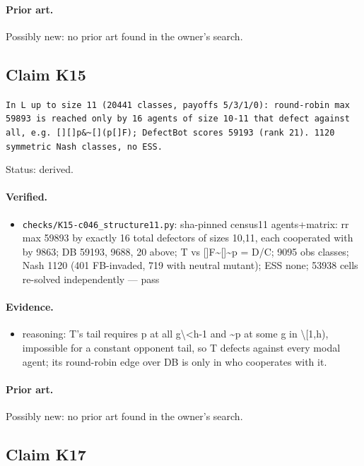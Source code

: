 \documentclass{article}
\begin{document}
\paragraph{Prior art.} Possibly new: no prior art found in the owner's search.

\subsection*{Claim K15}

\texttt{In L up to size 11 (20441 classes, payoffs 5/3/1/0): round-robin max 59893 is reached only by 16 agents of size 10-11 that defect against all, e.g. [][]p\&\textasciitilde{}[](p\textbar{}[]F); DefectBot scores 59193 (rank 21). 1120 symmetric Nash classes, no ESS.}

Status: derived.

\paragraph{Verified.}
\begin{itemize}
\item \texttt{checks/K15-c046\_structure11.py}: sha-pinned census11 agents+matrix: rr max 59893 by exactly 16 total defectors of sizes 10,11, each cooperated with by 9863; DB 59193, 9688, 20 above; T vs []F\textbar{}\textasciitilde{}[]\textasciitilde{}p = D/C; 9095 obs classes; Nash 1120 (401 FB-invaded, 719 with neutral mutant); ESS none; 53938 cells re-solved independently --- pass
\end{itemize}

\paragraph{Evidence.}
\begin{itemize}
\item reasoning: T's tail requires p at all g\textbackslash{}\textless{}h-1 and \textasciitilde{}p at some g in \textbackslash{}[1,h), impossible for a constant opponent tail, so T defects against every modal agent; its round-robin edge over DB is only in who cooperates with it.
\end{itemize}

\paragraph{Prior art.} Possibly new: no prior art found in the owner's search.

\subsection*{Claim K17}
\end{document}
